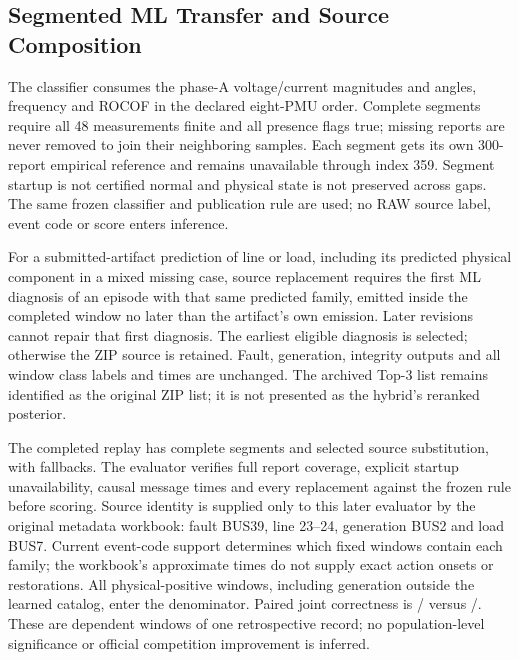 \subsection{Segmented ML Transfer and Source Composition}
The classifier consumes the phase-A voltage/current magnitudes and angles,
frequency and ROCOF in the declared eight-PMU order. Complete segments
require all 48 measurements finite and all presence flags true; missing
reports are never removed to join their neighboring samples. Each segment
gets its own 300-report empirical reference and remains unavailable through
index 359. Segment startup is not certified normal and physical state is
not preserved across gaps. The same frozen classifier and publication rule
are used; no RAW source label, event code or score enters inference.

For a submitted-artifact prediction of line or load, including its predicted
physical component in a mixed missing case, source replacement requires the
first ML diagnosis of an episode with that same predicted family, emitted
inside the completed window no later than the artifact's own emission.
Later revisions cannot repair that first diagnosis. The earliest eligible
diagnosis is selected; otherwise the ZIP source is retained. Fault,
generation, integrity outputs and all window class labels and times are
unchanged. The archived Top-3 list remains identified as the original ZIP
list; it is not presented as the hybrid's reranked posterior.

The completed replay has \RawHybridSegments{} complete segments and
\RawHybridRoutes{} selected source substitution, with
\RawHybridFallbacks{} fallbacks. The evaluator verifies full report
coverage, explicit startup unavailability, causal message times and every
replacement against the frozen rule before scoring. Source identity is
supplied only to this later evaluator by the original metadata workbook:
fault BUS39, line 23--24, generation BUS2 and load BUS7. Current event-code
support determines which fixed windows contain each family; the workbook's
approximate times do not supply exact action onsets or restorations.
All physical-positive windows, including generation outside the learned
catalog, enter the denominator. Paired joint correctness is
\RawZIPJoint{}/\RawZIPTotal{} versus
\RawHybridJoint{}/\RawHybridTotal{}. These are dependent windows of one
retrospective record; no population-level significance or official
competition improvement is inferred.
